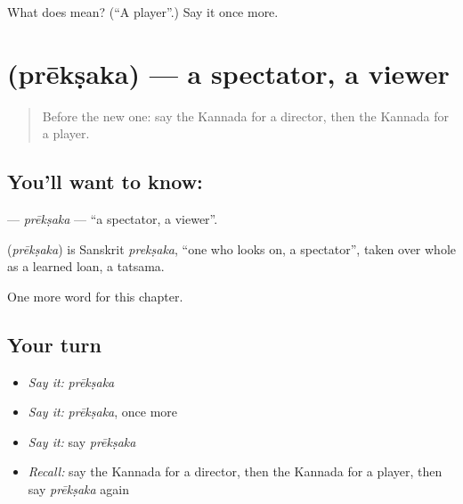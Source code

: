\begin{tcolorbox}[breakable,colback=teal!4,colframe=teal!35!black,title={Before you move on}]
What does  mean? (\textquotedblleft{}A player\textquotedblright{}.) Say it once more.
\end{tcolorbox}
\section[\texorpdfstring{\kn{ಪ್ರೇಕ್ಷಕ} (prēkṣaka)}{ಪ್ರೇಕ್ಷಕ (prēkṣaka)}]{ (prēkṣaka) — a spectator, a viewer}

\label{lesson:KA-C196-preksaka}



\begin{quote}
Before the new one: say the Kannada for a director, then the Kannada for a player.
\end{quote}

\subsection*{You'll want to know: }
\textbf{} — \emph{prēkṣaka} — \textquotedblleft{}a spectator, a viewer\textquotedblright{}.

\begin{cousinweb}
\textbf{} (\emph{prēkṣaka}) is Sanskrit \emph{prekṣaka}, \textquotedblleft{}one who looks on, a spectator\textquotedblright{}, taken over whole as a learned loan, a tatsama.
\end{cousinweb}

\begin{grammarlens}[title={What you've built}]
One more word for this chapter.
\end{grammarlens}

\subsection*{Your turn}
\begin{itemize}
\raggedright
  \item \emph{Say it:} \emph{prēkṣaka}
  \item \emph{Say it:} \emph{prēkṣaka}, once more
  \item \emph{Say it:} say \emph{prēkṣaka}
  \item \emph{Recall:} say the Kannada for a director, then the Kannada for a player, then say \emph{prēkṣaka} again
\end{itemize}

